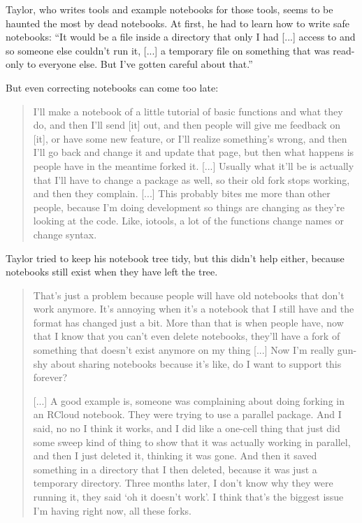 Taylor, who writes tools and example notebooks for those tools, seems to be
haunted the most by dead notebooks.  At first, he had to learn how to write safe
notebooks: ``It would be a file inside a directory that only I had [...] access
to and so someone else couldn't run it, [...] a temporary file on something that
was read-only to everyone else. But I've gotten careful about that.''

But even correcting notebooks can come too late:
\begin{quote}
I'll make a notebook of a
little tutorial of basic functions and what they do, and then I'll send [it]
out, and then people will give me feedback on [it], or have some new feature, or
I'll realize something's wrong, and then I'll go back and change it and update
that page, but then what happens is people have in the meantime forked it. [...]
Usually what it'll be is actually that I'll have to change a package as well, so
their old fork stops working, and then they complain. [...] This probably bites
me more than other people, because I'm doing development so things are changing
as they're looking at the code. Like, iotools, a lot of the functions change
names or change syntax.
\end{quote}

Taylor tried to keep his notebook tree tidy, but this didn't help either, because
notebooks still exist when they have left the tree.
\begin{quote}
That's just a problem because people will have old notebooks that
don't work anymore. It's annoying when it's a notebook that I still have and the
format has changed just a bit. More than that is when people have, now that I
know that you can't even delete notebooks, they'll have a fork of something that
doesn't exist anymore on my thing [...] Now I'm really gun-shy about sharing
notebooks because it's like, do I want to support this forever?

[...] A good example is, someone was complaining about doing forking in an
RCloud notebook. They were trying to use a parallel package. And I said, no no I
think it works, and I did like a one-cell thing that just did some sweep kind of
thing to show that it was actually working in parallel, and then I just deleted
it, thinking it was gone. And then it saved something in a directory that I then
deleted, because it was just a temporary directory. Three months later, I don't
know why they were running it, they said `oh it doesn't work'. I think that's
the biggest issue I'm having right now, all these forks.
\end{quote}

